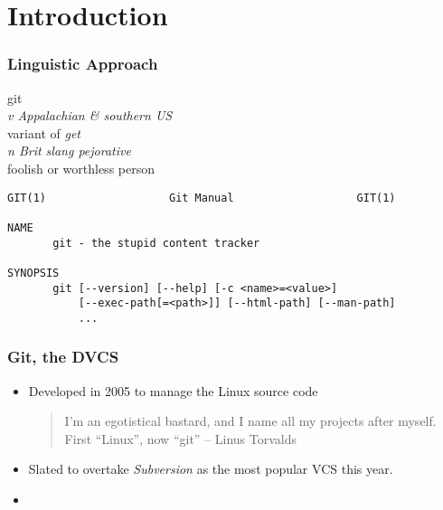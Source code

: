 
\section{Introduction}

\begin{frame}[fragile]
  \frametitle{Linguistic Approach}
  \vspace{-5mm}
  
  \begin{block}{}
    git \\
    \textit{v Appalachian \& southern US}\\
    \hspace{1cm} variant of \emph{get}\\
    \textit{n Brit slang pejorative}\\
    \hspace{1cm} foolish or worthless person
  \end{block}
  \bigskip
  \pause

  \small
\begin{verbatim}
GIT(1)                   Git Manual                   GIT(1)

NAME
       git - the stupid content tracker

SYNOPSIS
       git [--version] [--help] [-c <name>=<value>]
           [--exec-path[=<path>]] [--html-path] [--man-path]
           ...
\end{verbatim}

\end{frame}


\begin{frame}
  \frametitle{Git, the DVCS}

  \begin{itemize}
  \item 
    Developed in 2005 to manage the Linux source code
    \begin{quote}
      I'm an egotistical bastard, and I name all my projects after
      myself. First ``Linux'', now ``git'' -- Linus Torvalds
    \end{quote}
  \item Slated to overtake \emph{Subversion} as the most popular VCS
    this year.
  \item 
  \end{itemize}



\end{frame}


